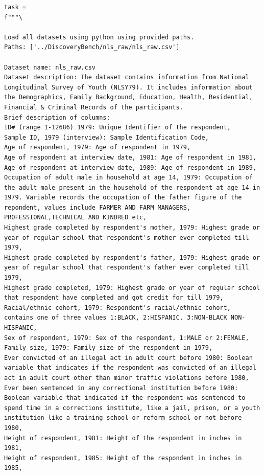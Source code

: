 \begin{verbatim}
task =
f"""\

Load all datasets using python using provided paths.
Paths: ['../DiscoveryBench/nls_raw/nls_raw.csv']

Dataset name: nls_raw.csv
Dataset description: The dataset contains information from National Longitudinal Survey of Youth (NLSY79). It includes information about the Demographics, Family Background, Education, Health, Residential, Financial & Criminal Records of the participants.
Brief description of columns:
ID# (range 1-12686) 1979: Unique Identifier of the respondent,
Sample ID, 1979 (interview): Sample Identification Code,
Age of respondent, 1979: Age of respondent in 1979,
Age of respondent at interview date, 1981: Age of respondent in 1981,
Age of respondent at interview date, 1989: Age of respondent in 1989,
Occupation of adult male in household at age 14, 1979: Occupation of the adult male present in the household of the respondent at age 14 in 1979. Variable records the occupation of the father figure of the repondent, values include FARMER AND FARM MANAGERS, PROFESSIONAL,TECHNICAL AND KINDRED etc,
Highest grade completed by respondent's mother, 1979: Highest grade or year of regular school that respondent's mother ever completed till 1979,
Highest grade completed by respondent's father, 1979: Highest grade or year of regular school that respondent's father ever completed till 1979,
Highest grade completed, 1979: Highest grade or year of regular school that respondent have completed and got credit for till 1979,
Racial/ethnic cohort, 1979: Respondent's racial/ethnic cohort, contains one of three values 1:BLACK, 2:HISPANIC, 3:NON-BLACK NON-HISPANIC,
Sex of respondent, 1979: Sex of the respondent, 1:MALE or 2:FEMALE,
Family size, 1979: Family size of the respondent in 1979,
Ever convicted of an illegal act in adult court before 1980: Boolean variable that indicates if the respondent was convicted of an illegal act in adult court other than minor traffic violations before 1980,
Ever been sentenced in any correctional institution before 1980: Boolean variable that indicated if the respondent was sentenced to spend time in a corrections institute, like a jail, prison, or a youth institution like a training school or reform school or not before 1980,
Height of respondent, 1981: Height of the respondent in inches in 1981,
Height of respondent, 1985: Height of the respondent in inches in 1985,

\end{verbatim}
